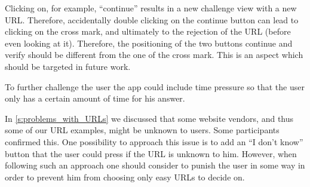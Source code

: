 \begin{description}[leftmargin=0cm]
Clicking on, for example, ``continue'' results in a new challenge view with a new URL.
Therefore, accidentally double clicking on the continue button can lead to clicking on the cross mark, and ultimately to the rejection of the URL (before even looking at it).
Therefore, the positioning of the two buttons continue and verify should be different from the one of the cross mark.
This is an aspect which should be targeted in future work. 
\item[Time Pressure:] To further challenge the user the app could include time pressure so that the user only has a certain amount of time for his answer.
\item[Unkown Services:] In \ref{s:problems_with_URLs} we discussed that some website vendors, and thus some of our URL examples, might be unknown to users. 
Some participants confirmed this.
One possibility to approach this issue is to add an ``I don't know'' button that the user could press if the URL is unknown to him. However, when following such an approach one should consider to punish the user in some way in order to prevent him from choosing only easy URLs to decide on.
\end{description}



